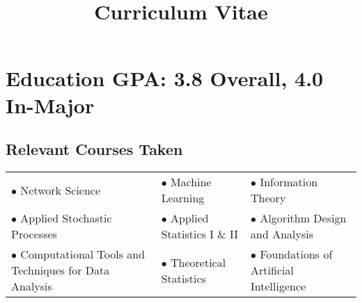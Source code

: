 \documentclass[11pt,a4paper,sans]{moderncv} %
\title{\\ Curriculum Vitae}
\begin{document}


%
%
%
%
%


\makecvtitle %


\section{Education  \hfill \normalsize GPA: 3.8 Overall, 4.0 In-Major}

\subsection{Relevant Courses Taken}
\begin{center}
\begin{tabularx}{\linewidth}{ X X X }
 $\bullet$ Network Science &  $\bullet$ Machine Learning & $\bullet$ Information Theory  \\ 
 $\bullet$ Applied Stochastic Processes & $\bullet$ Applied Statistics I \& II  & $\bullet$ Algorithm Design and Analysis  \\
 $\bullet$ Computational Tools and \; \mbox{Techniques} for Data Analysis &  $\bullet$ Theoretical Statistics & $\bullet$ Foundations of Artificial \; \mbox{Intelligence} 
\end{tabularx}
\end{center}
\end{document}
